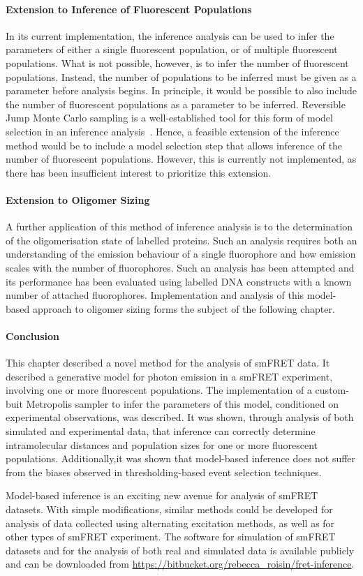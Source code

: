 \paragraph{Extension to Inference of Fluorescent Populations}
In its current implementation, the inference analysis can be used to infer the parameters of either a single fluorescent population, or of multiple fluorescent populations. What is not possible, however, is to infer the number of fluorescent populations. Instead, the number of populations to be inferred must be given as a parameter before analysis begins. In principle, it would be possible to also include the number of fluorescent populations as a parameter to be inferred. Reversible Jump Monte Carlo sampling is a well-established tool for this form of model selection in an inference analysis~\cite{green1995}. Hence, a feasible extension of the inference method would be to include a model selection step that allows inference of the number of fluorescent populations. However, this is currently not implemented, as there has been insufficient interest to prioritize this extension. 

\paragraph{Extension to Oligomer Sizing}
A further application of this method of inference analysis is to the determination of the oligomerisation state of labelled proteins. Such an analysis requires both an understanding of the emission behaviour of a single fluorophore and how emission scales with the number of fluorophores. Such an analysis has been attempted and its performance has been evaluated using labelled DNA constructs with a known number of attached fluorophores. Implementation and analysis of this model-based approach to oligomer sizing forms the subject of the following chapter.

\paragraph{Conclusion}
This chapter described a novel method for the analysis of smFRET data. It described a generative model for photon emission in a smFRET experiment, involving one or more fluorescent populations. The implementation of a custom-buit Metropolis sampler to infer the parameters of this model, conditioned on experimental observations, was described. It was shown, through analysis of both simulated and experimental data, that inference can correctly determine intramolecular distances and population sizes for one or more fluorescent populations. Additionally,it was shown that model-based inference does not suffer from the biases observed in thresholding-based event selection techniques.  

Model-based inference is an exciting new avenue for analysis of smFRET datasets. With simple modifications, similar methods could be developed for analysis of data collected using alternating excitation methods, as well as for other types of smFRET experiment. The software for simulation of smFRET datasets and for the analysis of both real and simulated data is available publicly and can be downloaded from \url{https://bitbucket.org/rebecca_roisin/fret-inference}. 
